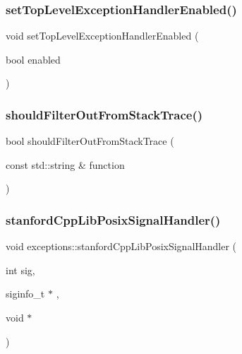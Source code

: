 \subsubsection{\texorpdfstring{set\+Top\+Level\+Exception\+Handler\+Enabled()}{setTopLevelExceptionHandlerEnabled()}}
{\footnotesize\ttfamily void set\+Top\+Level\+Exception\+Handler\+Enabled (\begin{DoxyParamCaption}\item[{bool}]{enabled }\end{DoxyParamCaption})}

\mbox{\label{namespaceexceptions_ac20de63bd41bb6c1f95bd2af4c3eaf53}} 
\subsubsection{\texorpdfstring{should\+Filter\+Out\+From\+Stack\+Trace()}{shouldFilterOutFromStackTrace()}}
{\footnotesize\ttfamily bool should\+Filter\+Out\+From\+Stack\+Trace (\begin{DoxyParamCaption}\item[{const std\+::string \&}]{function }\end{DoxyParamCaption})}

\mbox{\label{namespaceexceptions_af5fc12dcfd6bf28b568340210c9cc291}} 
\subsubsection{\texorpdfstring{stanford\+Cpp\+Lib\+Posix\+Signal\+Handler()}{stanfordCppLibPosixSignalHandler()}}
{\footnotesize\ttfamily void exceptions\+::stanford\+Cpp\+Lib\+Posix\+Signal\+Handler (\begin{DoxyParamCaption}\item[{int}]{sig,  }\item[{siginfo\+\_\+t $\ast$}]{,  }\item[{void $\ast$}]{ }\end{DoxyParamCaption})}

